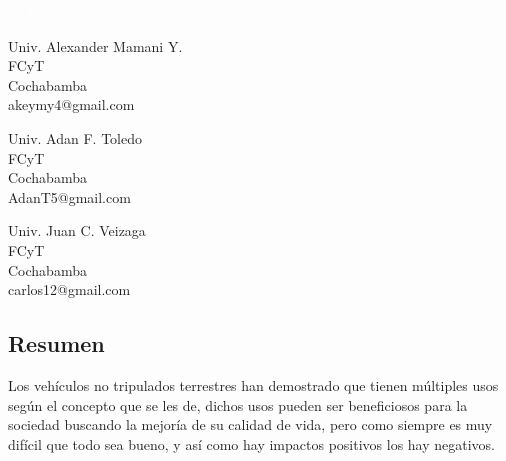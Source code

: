 \documentclass[letterpaper,12pt]{article}
\newcommand{\vacio}{\textcolor{white}{holacaracola}} 			%
\begin{document}
{%

\newpage

\renewcommand{\headrulewidth}{0.5pt}
\fancyhead[L]{\vacio}

\renewcommand{\footrulewidth}{0.5pt}
\fancyfoot[C]{\vacio}														%
{}								%
\
\vacio
\

\vspace{1cm}
\begin{minipage}[b]{5.3cm}
	\begin{center}
		Univ. Alexander Mamani Y.\\
		FCyT\\
		Cochabamba\\
		akeymy4@gmail.com
	\end{center}
\end{minipage} \hfill \begin{minipage}[b]{4cm}
	\begin{center}
		Univ. Adan F. Toledo\\
		FCyT\\
		Cochabamba\\
		AdanT5@gmail.com
	\end{center}
\end{minipage} \hfill \begin{minipage}[b]{4.5cm}
	\begin{center}
		Univ. Juan C. Veizaga\\
		FCyT\\
		Cochabamba\\
		carlos12@gmail.com
	\end{center}
\end{minipage}

\vspace{2cm}

\subsection*{Resumen}
	Los vehículos no tripulados terrestres han demostrado que tienen múltiples usos según el concepto que se les de, dichos usos pueden ser beneficiosos para la sociedad buscando la mejoría de su calidad de vida, pero como siempre es muy difícil que todo sea bueno, y así como hay impactos positivos los hay negativos.\\
	
}
\end{document}

